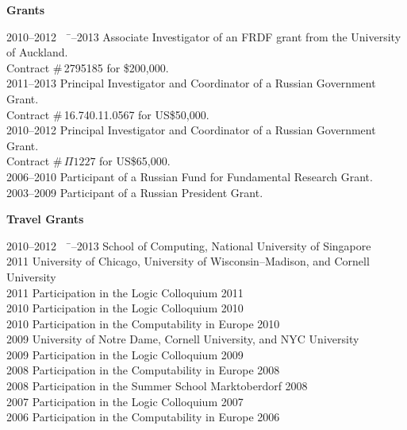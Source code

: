 \documentclass[12pt]{article}
\begin{document}
\centerline{\bf Grants}

\begin{tabbing}
2010--2012 \ \ \= --2013       \> Associate Investigator of an FRDF grant from the University of Auckland.\\
		\> Contract \#\,2795185 for \$200,000.\\
2011--2013       \> Principal Investigator and Coordinator of a Russian Government Grant.\\
		 \> Contract \#\,16.740.11.0567 for US\$50,000.\\
2010--2012       \> Principal Investigator and Coordinator of a Russian Government Grant.\\
		 \> Contract \#\,$\Pi1227$ for US\$65,000.\\
2006--2010       \> Participant of a Russian Fund for Fundamental Research Grant.\\
2003--2009      \> Participant of a Russian President Grant.\\
\end{tabbing}

\centerline{\bf Travel Grants}
\begin{tabbing}
2010--2012 \ \ \= --2013        \> School of Computing, National University of Singapore\\
2011                  \> University of Chicago, University of Wisconsin--Madison, and Cornell University\\
2011                  \> Participation in the Logic Colloquium 2011\\
2010                  \> Participation in the Logic Colloquium 2010\\
2010                  \> Participation in the Computability in Europe 2010\\
2009                  \> University of Notre Dame, Cornell University, and NYC University\\
2009                  \> Participation in the Logic Colloquium 2009\\
2008                  \> Participation in the Computability in Europe 2008\\
2008                  \> Participation in the Summer School Marktoberdorf 2008\\
2007                  \> Participation in the Logic Colloquium 2007\\
2006                  \> Participation in the Computability in Europe 2006\\
\end{tabbing}
\end{document}
